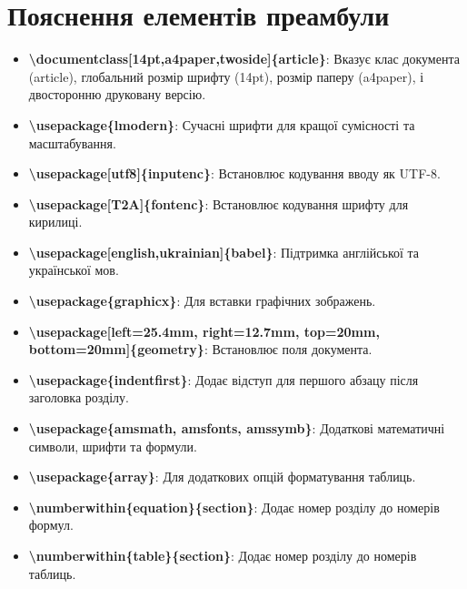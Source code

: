 	\section{Пояснення елементів преамбули}
	
	\begin{itemize}
		\item \textbf{\textbackslash documentclass[14pt,a4paper,twoside]\{article\}}: Вказує клас документа (article), глобальний розмір шрифту (14pt), розмір паперу (a4paper), і двосторонню друковану версію.
		
		\item \textbf{\textbackslash usepackage\{lmodern\}}: Сучасні шрифти для кращої сумісності та масштабування.
		
		\item \textbf{\textbackslash usepackage[utf8]\{inputenc\}}: Встановлює кодування вводу як UTF-8.
		
		\item \textbf{\textbackslash usepackage[T2A]\{fontenc\}}: Встановлює кодування шрифту для кирилиці.
		
		\item \textbf{\textbackslash usepackage[english,ukrainian]\{babel\}}: Підтримка англійської та української мов.
		
		\item \textbf{\textbackslash usepackage\{graphicx\}}: Для вставки графічних зображень.
		
		\item \textbf{\textbackslash usepackage[left=25.4mm, right=12.7mm, top=20mm, bottom=20mm]\{geometry\}}: Встановлює поля документа.
		
		\item \textbf{\textbackslash usepackage\{indentfirst\}}: Додає відступ для першого абзацу після заголовка розділу.
		
		\item \textbf{\textbackslash usepackage\{amsmath, amsfonts, amssymb\}}: Додаткові математичні символи, шрифти та формули.
		
		\item \textbf{\textbackslash usepackage\{array\}}: Для додаткових опцій форматування таблиць.
		
		\item \textbf{\textbackslash numberwithin\{equation\}\{section\}}: Додає номер розділу до номерів формул.
		
		\item \textbf{\textbackslash numberwithin\{table\}\{section\}}: Додає номер розділу до номерів таблиць.
		

\end{itemize}
